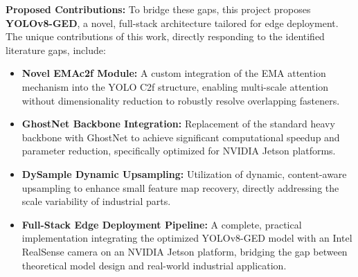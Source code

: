 \textbf{Proposed Contributions:} To bridge these gaps, this project proposes \textbf{YOLOv8-GED}, a novel, full-stack architecture tailored for edge deployment. The unique contributions of this work, directly responding to the identified literature gaps, include:
\begin{itemize}
    \item \textbf{Novel EMAc2f Module:} A custom integration of the EMA attention mechanism into the YOLO C2f structure, enabling multi-scale attention without dimensionality reduction to robustly resolve overlapping fasteners.
    \item \textbf{GhostNet Backbone Integration:} Replacement of the standard heavy backbone with GhostNet to achieve significant computational speedup and parameter reduction, specifically optimized for NVIDIA Jetson platforms.
    \item \textbf{DySample Dynamic Upsampling:} Utilization of dynamic, content-aware upsampling to enhance small feature map recovery, directly addressing the scale variability of industrial parts.
    \item \textbf{Full-Stack Edge Deployment Pipeline:} A complete, practical implementation integrating the optimized YOLOv8-GED model with an Intel RealSense camera on an NVIDIA Jetson platform, bridging the gap between theoretical model design and real-world industrial application.
\end{itemize}